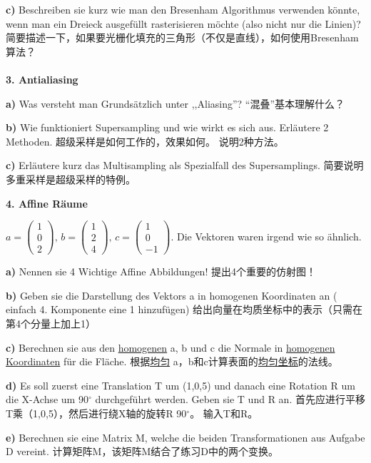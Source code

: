 \documentclass[fleqn]{article}
\begin{document}
\indent\textbf{c)} Beschreiben sie kurz wie man den Bresenham Algorithmus verwenden könnte, wenn man ein Dreieck ausgefüllt rasterisieren möchte (also nicht nur die Linien)?
简要描述一下，如果要光栅化填充的三角形（不仅是直线），如何使用Bresenham算法？
\\
\\
\noindent\textbf{3. Antialiasing}

\indent\textbf{a)} Was versteht man Grundsätzlich unter ,,Aliasing''? “混叠”基本理解什么？

\indent\textbf{b)} Wie funktioniert Supersampling und wie wirkt es sich aus. Erläutere 2 Methoden. 超级采样是如何工作的，效果如何。 说明2种方法。

\indent\textbf{c)} Erläutere kurz das Multisampling als Spezialfall des Supersamplings. 简要说明多重采样是超级采样的特例。

\noindent\textbf{4. Affine Räume}

$a=\begin{pmatrix}
    1\\0\\2
\end{pmatrix},\,b=\begin{pmatrix}
    1\\2\\4
\end{pmatrix},\,c=\begin{pmatrix}
    1\\0\\-1
\end{pmatrix}$. Die Vektoren waren irgend wie so ähnlich.

\indent\textbf{a)} Nennen sie 4 Wichtige Affine Abbildungen! 提出4个重要的仿射图！

\indent\textbf{b)} Geben sie die Darstellung des Vektors a in homogenen Koordinaten an ( einfach 4. Komponente eine 1 hinzufügen)
给出向量在均质坐标中的表示（只需在第4个分量上加上1）

\indent\textbf{c)} Berechnen sie aus den \underline{homogenen} a, b und c die Normale in \underline{homogenen Koordinaten} für die Fläche.
根据\underline{均匀} a，b和c计算表面的\underline{均匀坐标}的法线。

\indent\textbf{d)} Es soll zuerst eine Translation T um (1,0,5) und danach eine Rotation R um die X-Achse um 90$^\circ$ durchgeführt werden. Geben sie T und R an.
首先应进行平移T乘（1,0,5），然后进行绕X轴的旋转R 90$^\circ$。 输入T和R。

\indent\textbf{e)} Berechnen sie eine Matrix M, welche die beiden Transformationen aus Aufgabe D vereint.
计算矩阵M，该矩阵M结合了练习D中的两个变换。
\end{document}
